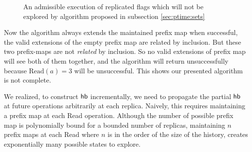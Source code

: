 \begin{figure}
\begin{minipage}{\textwidth}
      \caption{An admissible execution of replicated flags which will not be explored by algorithm proposed in subsection \ref{sec:ptime:sets}}
      \label{correction:fig2}
  \end{minipage}
  \end{figure}

Now the algorithm always extends the maintained prefix map \ie when successful, the valid extensions of the empty prefix map are related by inclusion. But these two prefix-maps are not \emph{related} by inclusion. So no valid extensions of prefix map will see both of them together, and the algorithm will return unsuccessfully because $\mathrm{Read}(a) = 3$ will be unsuccessful. This shows our presented algorithm is not complete.

We realized, to construct $\textsf{hb}$ incrementally, we need to propagate the partial $\textsf{hb}$ at future operations arbitrarily at each replica. Naively, this requires maintaining a prefix map at each \textrm{Read} operation. Although the number of possible prefix map is polynomially bound for a bounded number of replicas, maintaining $n$ prefix maps at each \textrm{Read} where $n$ is in the order of the size of the history, creates exponentially many possible states to explore.

